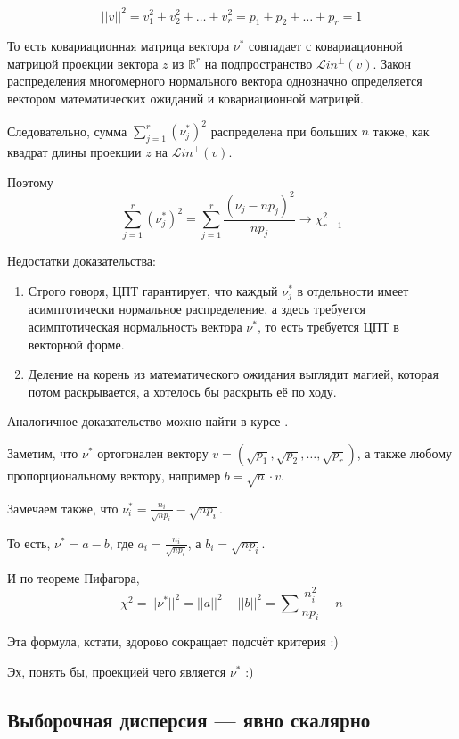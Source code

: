 \documentclass[11pt,russian,]{article}
\newcommand{\RR}{\mathbb{R}}
\newcommand{\1}{\mathbbm{1}}
\newcommand{\Lin}{\mathcal{L}in}
\newcommand{\Linp}{\Lin^{\perp}}
\begin{document}
\[
||v||^2 = v_1^2 + v_2^2 + \ldots + v_r^2 = p_1 + p_2 + \ldots + p_r = 1
\]

То есть ковариационная матрица вектора \(\nu^*\) совпадает с
ковариационной матрицой проекции вектора \(z\) из \(\RR^r\) на
подпространство \(\Linp(v)\). Закон распределения многомерного
нормального вектора однозначно определяется вектором математических
ожиданий и ковариационной матрицей.

Следовательно, сумма \(\sum_{j=1}^r (\nu_j^*)^2\) распределена при
больших \(n\) также, как квадрат длины проекции \(z\) на \(\Linp(v)\).

Поэтому \[
\sum_{j=1}^r (\nu_j^*)^2 = \sum_{j=1}^r \frac{(\nu_j - np_j)^2}{np_j} \to \chi^2_{r-1}
\]

Недостатки доказательства:

\begin{enumerate}
\def\labelenumi{\arabic{enumi}.}
\item
  Строго говоря, ЦПТ гарантирует, что каждый \(\nu_j^*\) в отдельности
  имеет асимптотически нормальное распределение, а здесь требуется
  асимптотическая нормальность вектора \(\nu^*\), то есть требуется ЦПТ
  в векторной форме.
\item
  Деление на корень из математического ожидания выглядит магией, которая
  потом раскрывается, а хотелось бы раскрыть её по ходу.
\end{enumerate}

Аналогичное доказательство можно найти в курсе
\textcite{panchenko2005statistics}.

Заметим, что \(\nu^*\) ортогонален вектору
\(v= (\sqrt{p_1}, \sqrt{p_2}, \ldots, \sqrt{p_r})\), а также любому
пропорциональному вектору, например \(b = \sqrt n \cdot v\).

Замечаем также, что \(\nu^*_i = \frac{n_i}{\sqrt{np_i}} - \sqrt{np_i}\).

То есть, \(\nu^* = a - b\), где \(a_i = \frac{n_i}{\sqrt{np_i}}\), а
\(b_i = \sqrt{np_i}\).

И по теореме Пифагора, \[
\chi^2 = ||\nu^*||^2 = ||a||^2 - ||b||^2 = \sum \frac{n_i^2}{np_i} - n
\]

Эта формула, кстати, здорово сокращает подсчёт критерия :)

Эх, понять бы, проекцией чего является \(\nu^*\) :)

\subsection{Выборочная дисперсия --- явно скалярно}\label{---}
\end{document}
